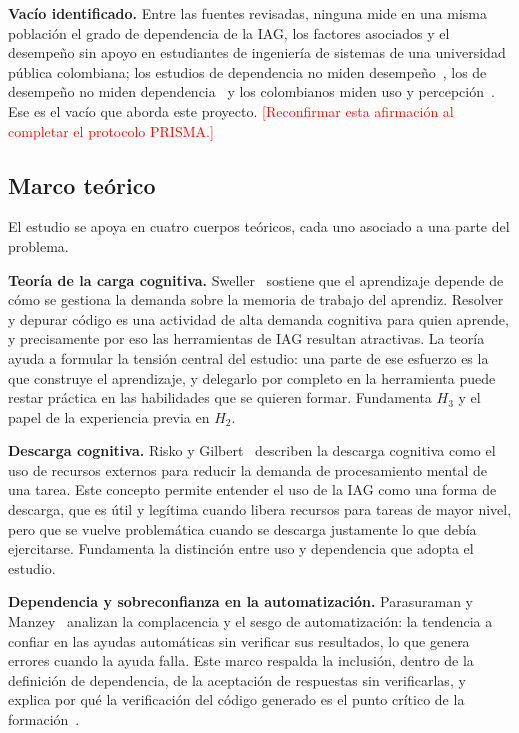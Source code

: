 \documentclass[12pt,letterpaper]{article}
\numberwithin{table}{section}
\numberwithin{figure}{section}
\newcommand{\pendiente}[1]{\textcolor{red}{[#1]}}
\begin{document}
\textbf{Vacío identificado.} Entre las fuentes revisadas, ninguna mide en una misma población el grado de dependencia de la IAG, los factores asociados y el desempeño sin apoyo en estudiantes de ingeniería de sistemas de una universidad pública colombiana; los estudios de dependencia no miden desempeño~\cite{moralesgarcia2024development,zhang2024dependency}, los de desempeño no miden dependencia~\cite{prather2024widening,bastani2025generative} y los colombianos miden uso y percepción~\cite{gomez2025estudio}. Ese es el vacío que aborda este proyecto. \pendiente{Reconfirmar esta afirmación al completar el protocolo PRISMA.}

\subsection{Marco teórico}

El estudio se apoya en cuatro cuerpos teóricos, cada uno asociado a una parte del problema.

\textbf{Teoría de la carga cognitiva.} Sweller~\cite{sweller1994cognitive} sostiene que el aprendizaje depende de cómo se gestiona la demanda sobre la memoria de trabajo del aprendiz. Resolver y depurar código es una actividad de alta demanda cognitiva para quien aprende, y precisamente por eso las herramientas de IAG resultan atractivas. La teoría ayuda a formular la tensión central del estudio: una parte de ese esfuerzo es la que construye el aprendizaje, y delegarlo por completo en la herramienta puede restar práctica en las habilidades que se quieren formar. Fundamenta $H_3$ y el papel de la experiencia previa en $H_2$.

\textbf{Descarga cognitiva.} Risko y Gilbert~\cite{risko2016cognitive} describen la descarga cognitiva como el uso de recursos externos para reducir la demanda de procesamiento mental de una tarea. Este concepto permite entender el uso de la IAG como una forma de descarga, que es útil y legítima cuando libera recursos para tareas de mayor nivel, pero que se vuelve problemática cuando se descarga justamente lo que debía ejercitarse. Fundamenta la distinción entre uso y dependencia que adopta el estudio.

\textbf{Dependencia y sobreconfianza en la automatización.} Parasuraman y Manzey~\cite{parasuraman2010complacency} analizan la complacencia y el sesgo de automatización: la tendencia a confiar en las ayudas automáticas sin verificar sus resultados, lo que genera errores cuando la ayuda falla. Este marco respalda la inclusión, dentro de la definición de dependencia, de la aceptación de respuestas sin verificarlas, y explica por qué la verificación del código generado es el punto crítico de la formación~\cite{lee2025impact}.
\end{document}
